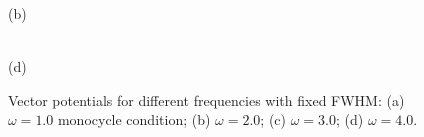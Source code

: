 \begin{figure}[h!]
\begin{minipage}[h]{0.5\linewidth}
 (b) \\
\end{minipage}
\hfill
\begin{minipage}[h]{0.5\linewidth}
 \\(d)
\end{minipage}
\caption{Vector potentials for different frequencies with fixed FWHM: (a) $\omega=1.0$ monocycle condition; (b) $\omega=2.0$; (c) $\omega=3.0$; (d) $\omega=4.0$.}
\label{fig:Pulses_4}
\end{figure}

